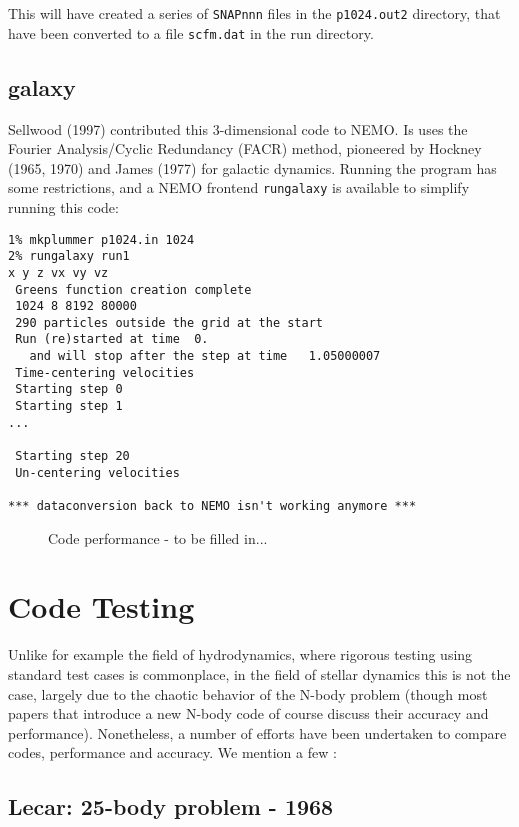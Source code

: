 This will have created a series of {\tt SNAPnnn} files in the {\tt p1024.out2}
directory, that have been converted to a file {\tt scfm.dat} in the 
run directory.

\section{galaxy}

Sellwood (1997) contributed this 3-dimensional code to NEMO. Is uses the
Fourier Analysis/Cyclic Redundancy (FACR) method, pioneered by
Hockney (1965, 1970) and James (1977) for galactic dynamics. Running
the program has some restrictions, and a NEMO frontend {\tt rungalaxy}
is available to simplify running this code:

\footnotesize\begin{verbatim}
1% mkplummer p1024.in 1024
2% rungalaxy run1
x y z vx vy vz
 Greens function creation complete
 1024 8 8192 80000
 290 particles outside the grid at the start
 Run (re)started at time  0.
   and will stop after the step at time   1.05000007
 Time-centering velocities
 Starting step 0
 Starting step 1
...

 Starting step 20
 Un-centering velocities

*** dataconversion back to NEMO isn't working anymore ***

\end{verbatim}\normalsize

\begin{figure}[htb]
\caption{Code performance - to be filled in...}
\end{figure}


\chapter                {Code Testing}

Unlike for example the field of hydrodynamics, where rigorous testing using standard
test cases is commonplace, 
in the field of stellar dynamics this is not the case, largely due to
the chaotic behavior of the N-body problem 
(though
most papers that introduce a new N-body code of course discuss
their accuracy and performance).
Nonetheless, a
number of efforts have been undertaken to compare codes, performance and
accuracy. We mention a few :


\section{Lecar: 25-body problem - 1968}

